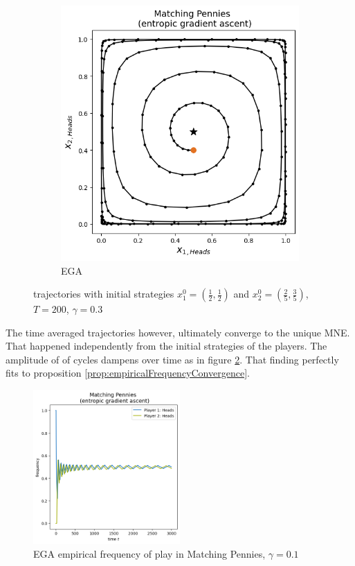 \begin{figure}[H]
\begin{subfigure}{.5\textwidth}
    \includegraphics[width=\textwidth]{logos/Pennies6.png}
    \caption{EGA}
\end{subfigure}
\caption{trajectories with initial strategies $x_{1}^0 = (\frac{1}{2},\frac{1}{2})$ and $x_{2}^0 = (\frac{2}{5},\frac{3}{5})$, $T = 200$, $\gamma = 0.3$}
\label{fig:PenniesDivergence}
\end{figure}


The time averaged trajectories however, ultimately converge to the unique MNE. That happened independently from the initial strategies of the players. The amplitude of of cycles dampens over time as in figure \ref{fig:Pennies7}. That finding perfectly fits to proposition \ref{prop:empiricalFrequencyConvergence}.

\begin{figure}[H]
    \centering
    \includegraphics[width=0.5\textwidth]{logos/Pennies7.png}
    \caption{EGA empirical frequency of play in Matching Pennies, $\gamma = 0.1$}
    \label{fig:Pennies7}
\end{figure}



